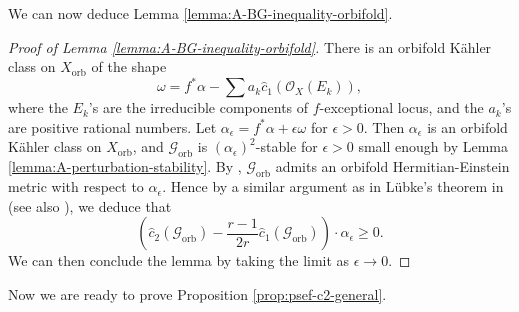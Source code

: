 \documentclass[12pt]{amsart}
\newcommand{\<}{\leq}
\def\>{\geq}
\def\mcO{\mathcal{O}}
\def\mcG{\mathcal{G}}
\theoremstyle{remark}
\theoremstyle{definition}
\theoremstyle{definition}
\numberwithin{equation}{section}
\theoremstyle{definition}
\theoremstyle{definition}
\def\orb{\mathrm{orb}}
\begin{document}
We can now deduce Lemma \ref{lemma:A-BG-inequality-orbifold}.


\begin{proof} [{Proof of Lemma \ref{lemma:A-BG-inequality-orbifold}}]
There is an 
orbifold K\"ahler class on $X_{\orb}$ of the shape 
\[
\omega=f^*\alpha -\sum a_k \hat{c}_1( \mcO_{X}(E_k)),
\]
where the $E_k$'s are the irreducible components of $f$-exceptional locus, and the $a_k$'s are positive rational numbers.  
Let $\alpha_\epsilon = f^*\alpha + \epsilon \omega$ for $\epsilon >0$.  
Then $\alpha_\epsilon$ is an orbifold K\"ahler class on  $X_{\orb}$, 
and $\mcG_{\orb}$ is $(\alpha_\epsilon)^{2}$-stable for $\epsilon>0$ small enough by Lemma \ref{lemma:A-perturbation-stability}. 
By \cite[Theorem 1]{Faulk2022}, $\mcG_{\orb}$ admits an orbifold Hermitian-Einstein metric with respect to $\alpha_\epsilon$. 
Hence by a similar argument as in  L\"ubke's theorem in \cite{Lub82}  (see also \cite[Theorem 4.4.7]{Kob14}), we deduce that
\[
\left(\hat{c}_2(\mcG_{\orb}) - \frac{r-1}{2r}\hat{c}_1(\mcG_{\orb})\right)\cdot \alpha_\epsilon \> 0.
\] 
We can then conclude the lemma by taking the limit as $\epsilon\to 0$.
\end{proof}




 


Now we  are ready to prove   Proposition \ref{prop:psef-c2-general}. 
\end{document}
